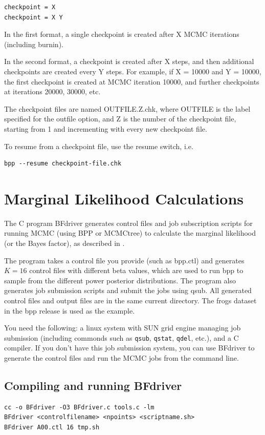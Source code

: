 \documentclass{book}
\numberwithin{equation}{section} \renewcommand{\baselinestretch}{0.55}
\begin{document}
\begin{verbatim}
checkpoint = X
checkpoint = X Y
\end{verbatim}
In the first format, a single checkpoint is created after X MCMC
iterations (including burnin).

In the second format, a checkpoint is created after X steps, and then
additional checkpoints are created every Y steps.  For example, if X =
10000 and Y = 10000, the first checkpoint is created at MCMC iteration
10000, and further checkpoints at iterations 20000, 30000, etc.

The checkpoint files are named OUTFILE.Z.chk, where OUTFILE is the
label specified for the outfile option, and Z is the number of the
checkpoint file, starting from 1 and incrementing with every new
checkpoint file.

To resume from a checkpoint file, use the resume switch, i.e.
\begin{verbatim}
bpp --resume checkpoint-file.chk
\end{verbatim}

\section{Marginal Likelihood Calculations}
The C program BFdriver generates control files and job subscription
scripts for running MCMC (using BPP or MCMCtree) to calculate the
marginal likelihood (or the Bayes factor), as described in
\citet{Rannala2017}.

The program takes a control file you provide (such as bpp.ctl) and
generates $K = 16$ control files with different beta values, which are
used to run bpp to sample from the different power posterior
distributions.  The program also generates job submission scripts and
submit the jobs using qsub.  All generated control files and output
files are in the same current directory.  The frogs dataset in the bpp
release \citep{Yang2015} is used as the example.

You need the following: a linux system with SUN grid engine managing
job submission (including commonds such as \texttt{qsub},
\texttt{qstat}, \texttt{qdel}, etc.), and a C compiler.  If you don't
have this job submission system, you can use BFdriver to generate the
control files and run the MCMC jobs from the command line.

\subsection{Compiling and running BFdriver}
\begin{verbatim}
cc -o BFdriver -O3 BFdriver.c tools.c -lm
BFdriver <controlfilename> <npoints> <scriptname.sh>
BFdriver A00.ctl 16 tmp.sh
\end{verbatim}
\end{document}
